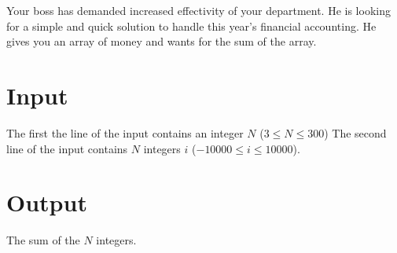 

Your boss has demanded increased effectivity of your department.
He is looking for a simple and quick solution to handle this year's financial accounting.
He gives you an array of money and wants for the sum of the array.

\section*{Input}

The first the line of the input contains an integer $N$ ($3 \leq N \leq 300$)
The second line of the input contains $N$ integers $i$ ($-10000 \leq i \leq 10000$).

\section*{Output}

The sum of the $N$ integers.